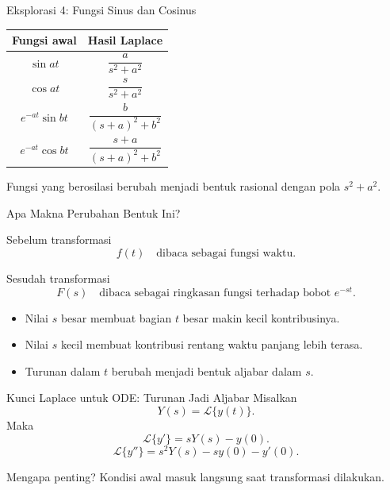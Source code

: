 \documentclass[aspectratio=169,11pt]{beamer}
\newcommand{\lap}[1]{\mathcal{L}\{#1\}}
\begin{document}
\begin{frame}{Eksplorasi 4: Fungsi Sinus dan Cosinus}
\begin{center}
\begin{tabular}{c c}
\toprule
\textbf{Fungsi awal} & \textbf{Hasil Laplace} \\
\midrule
$\sin at$ & $\dfrac{a}{s^2+a^2}$ \\
$\cos at$ & $\dfrac{s}{s^2+a^2}$ \\
$e^{-at}\sin bt$ & $\dfrac{b}{(s+a)^2+b^2}$ \\
$e^{-at}\cos bt$ & $\dfrac{s+a}{(s+a)^2+b^2}$ \\
\bottomrule
\end{tabular}
\end{center}
\vspace{0.2cm}
Fungsi yang berosilasi berubah menjadi bentuk rasional dengan pola $s^2+a^2$.
\end{frame}

\begin{frame}{Apa Makna Perubahan Bentuk Ini?}
\begin{block}{Sebelum transformasi}
\[
 f(t) \quad \text{dibaca sebagai fungsi waktu.}
\]
\end{block}
\begin{block}{Sesudah transformasi}
\[
 F(s) \quad \text{dibaca sebagai ringkasan fungsi terhadap bobot } e^{-st}.
\]
\end{block}
\begin{itemize}
  \item Nilai $s$ besar membuat bagian $t$ besar makin kecil kontribusinya.
  \item Nilai $s$ kecil membuat kontribusi rentang waktu panjang lebih terasa.
  \item Turunan dalam $t$ berubah menjadi bentuk aljabar dalam $s$.
\end{itemize}
\end{frame}

\begin{frame}{Kunci Laplace untuk ODE: Turunan Jadi Aljabar}
Misalkan
\[
Y(s)=\lap{y(t)}.
\]
Maka
\[
\boxed{\lap{y'}=sY(s)-y(0).}
\]
\[
\boxed{\lap{y''}=s^2Y(s)-s y(0)-y'(0).}
\]
\begin{alertblock}{Mengapa penting?}
Kondisi awal masuk langsung saat transformasi dilakukan.
\end{alertblock}
\end{frame}
\end{document}
